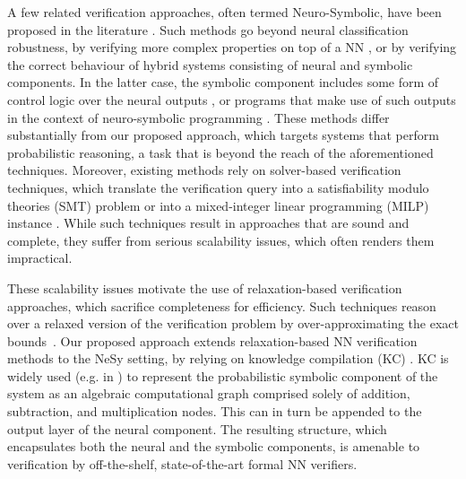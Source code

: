 

A few related verification approaches, often termed Neuro-Symbolic, have been proposed in the literature \cite{akintunde2020verifying,xie2022neuro,daggitt2024vehiclebridgingembeddinggap}. Such methods go beyond neural classification robustness, by verifying more complex properties on top of a NN \cite{xie2022neuro}, or by verifying the correct behaviour of hybrid systems consisting of neural and symbolic components. In the latter case, the symbolic component includes some form of control logic over the neural outputs \cite{akintunde2020verifying}, or programs that make use of such outputs in the context of neuro-symbolic programming \cite{daggitt2024vehiclebridgingembeddinggap}. These methods differ substantially from our proposed approach, which targets systems that perform probabilistic reasoning, a task that is beyond the reach of the aforementioned techniques. Moreover, existing methods rely on solver-based verification techniques, which translate the verification query into a satisfiability modulo theories (SMT) problem \cite{xie2022neuro,daggitt2024vehiclebridgingembeddinggap} or into a mixed-integer linear programming (MILP) instance \cite{akintunde2020verifying}. While such techniques result in approaches that are sound and complete, they suffer from serious scalability issues, which often renders them impractical. 

These scalability issues motivate the use of relaxation-based verification approaches, which sacrifice completeness for efficiency. Such techniques reason over a relaxed version of the verification problem by over-approximating the exact bounds~\cite{Ehlers17,autolirpaXu2020}. Our proposed approach extends relaxation-based NN verification methods to the NeSy setting, by relying on knowledge compilation (KC) \cite{darwiche2002knowledge}. KC is widely used (e.g. in \cite{xu2018semantic,manhaeve2018deepproblog}) to represent the probabilistic symbolic component of the system as an algebraic computational graph comprised solely of addition, subtraction, and multiplication nodes. This can in turn be appended to the output layer of the neural component. The resulting structure, which encapsulates both the neural and the symbolic components, is amenable to verification by off-the-shelf, state-of-the-art formal NN verifiers. 

